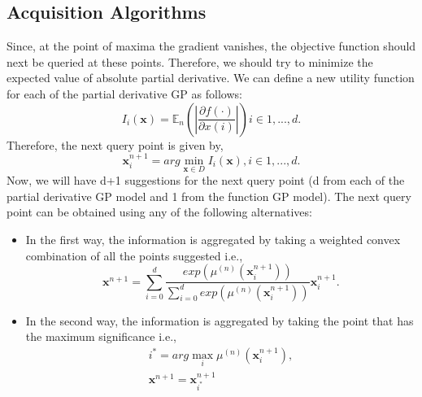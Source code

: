 \documentclass{article}
\begin{document}
    \subsection{Acquisition Algorithms}
        Since, at the point of maxima the gradient vanishes, the objective function should next be queried at these points. Therefore, we should try to 
        minimize the expected value of absolute partial derivative. We can define a new utility function for each of the partial derivative GP as follows:
        \begin{equation}
			I_{i}(\textbf {x}) = \mathbb{E}_{n} \left( \left |\frac{\partial f(\cdot)}{\partial x(i)} \right | \right )     i \in {1,...,d}.
            \label{custom_gradient_acquisition_function}
		\end{equation}
        Therefore, the next query point is given by,
        \begin{equation}
			\textbf{x}^{n+1}_{i} = arg \min_{\textbf{x} \in D} I_{i}(\textbf {x}), i \in {1,...,d}.
		\end{equation}
        Now, we will have d+1 suggestions for the next query point (d from each of the partial derivative GP model and 1 from the function GP model). The next
        query point can be obtained using any of the following alternatives:
        \begin{itemize}
            \item In the first way, the information is aggregated by taking a weighted convex combination of all the points suggested i.e.,
                \begin{equation}
                    \textbf {x}^{n+1} = \sum_{i=0}^{d} \frac {exp(\mu^{(n)}(\textbf{x}^{n+1}_{i}))}{\sum_{i=0}^{d} exp(\mu^{(n)}(\textbf{x}^{n+1}_{i}))} \textbf{x}^{n+1}_{i}.
                    \label{convex_combination}
                \end{equation}
            \item In the second way, the information is aggregated by taking the point that has the maximum significance i.e.,
                \begin{equation}
                \begin{split}
                    i^{*} = arg \max_{i} \mu^{(n)}(\textbf{x}^{n+1}_{i}), \\
                    \textbf{x}^{n+1} = \textbf{x}^{n+1}_{i^{*}}
                \end{split}
                \label{maximum_combination}
                \end{equation}
        \end{itemize}
\end{document}
